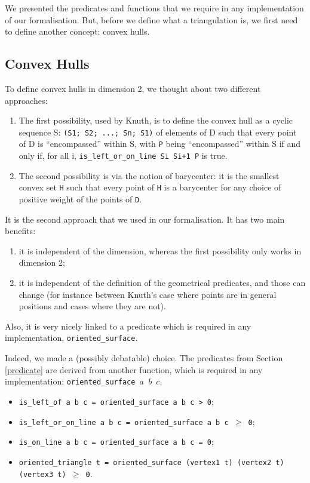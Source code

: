 \documentclass[a4paper,10pt]{article}
\def\ttt#1#2{{\tt{\color{black}#1} #2}}
\begin{document}
We presented the predicates and functions that we require in any implementation of our formalisation. But, before we define what a triangulation is, we first need to define another concept: convex hulls.
      
\subsection{Convex Hulls}


To define convex hulls in dimension 2, we thought about two different approaches:
\begin{enumerate}
\item The first possibility, used by Knuth,  is to define the convex hull as a cyclic sequence S: {\tt (S1; S2; ...; Sn; S1)} of elements of D such that every point of D is ``encompassed'' within S, with {\tt P} being ``encompassed'' within S if and only if, for all i,  {\tt is\_left\_or\_on\_line Si Si+1 P} is true.

\item The second possibility is via the notion of barycenter: it is the smallest convex set {\tt H} such that every point of {\tt H} is a barycenter for any choice of positive weight of the points of {\tt D}.
\end{enumerate}

It is the second approach that we used in our formalisation. It has two main benefits:
\begin{enumerate}
\item it is independent of the dimension, whereas the first possibility only works in dimension 2;
\item it is independent of the definition of the geometrical predicates, and those can change (for instance between Knuth's case where points are in general positions and cases where they are not). 
\end{enumerate}




Also, it is very nicely linked to a predicate which is required in any implementation, {\tt oriented\_surface}.


Indeed, we made a (possibly debatable) choice. The predicates from Section \ref{predicate} are derived from another function, which is required in any implementation: \ttt{oriented\_surface}{$a$ $b$ $c$}.
\begin{itemize}
\item \ttt{is\_left\_of}{a b c = oriented\_surface a b c > 0};
  \item \ttt{is\_left\_or\_on\_line}{a b c = oriented\_surface a b c $\geq$ 0};
  \item \ttt{is\_on\_line}{a b c = oriented\_surface a b c = 0};
 \item \ttt{oriented\_triangle}{t = oriented\_surface (vertex1 t) (vertex2 t) (vertex3 t) $\geq$ 0}.
 \end{itemize}
\end{document}
